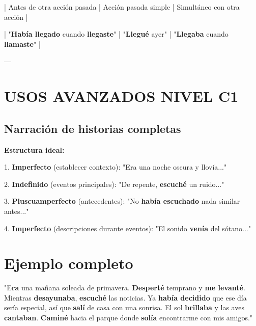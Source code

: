 \documentclass[a4paper,11pt]{article}
\begin{document}
| Antes de otra acción pasada | Acción pasada simple | Simultáneo con otra acción |

| "\textbf{Había llegado} cuando \textbf{llegaste}" | "\textbf{Llegué} ayer" | "\textbf{Llegaba} cuando \textbf{llamaste}" |

\vspace{0.2cm}

---

\vspace{0.2cm}

\section{USOS AVANZADOS NIVEL C1}

\vspace{0.2cm}

\subsection{Narración de historias completas}

\vspace{0.2cm}

\textbf{Estructura ideal:}

1. \textbf{Imperfecto} (establecer contexto): "Era una noche oscura y llovía..."

2. \textbf{Indefinido} (eventos principales): "De repente, \textbf{escuché} un ruido..."

3. \textbf{Pluscuamperfecto} (antecedentes): "No \textbf{había escuchado} nada similar antes..."

4. \textbf{Imperfecto} (descripciones durante eventos): "El sonido \textbf{venía} del sótano..."

\vspace{0.2cm}

\section{Ejemplo completo}

"E\textbf{ra} una mañana soleada de primavera. \textbf{Desperté} temprano y \textbf{me levanté}. Mientras \textbf{desayunaba}, \textbf{escuché} las noticias. Ya \textbf{había decidido} que ese día sería especial, así que \textbf{salí} de casa con una sonrisa. El sol \textbf{brillaba} y las aves \textbf{cantaban}. \textbf{Caminé} hacia el parque donde \textbf{solía} encontrarme con mis amigos."

\vspace{0.2cm}
\end{document}
